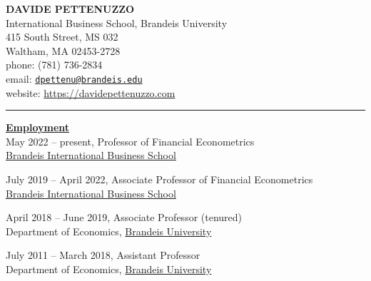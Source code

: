 \documentclass[12pt]{article}
\begin{document}
\begin{center}
\textbf{DAVIDE PETTENUZZO} \\
International Business School, Brandeis University \\
415 South Street, MS 032\\
Waltham, MA 02453-2728 \\
phone: (781) 736-2834 \\
email: \href{mailto:dpettenu@brandeis.edu}{\nolinkurl{dpettenu@brandeis.edu}} \\
website: \url{https://davidepettenuzzo.com} \\
\end{center}
\hrule 

\bigskip

\vspace{0.15in}

\underline{\textbf{Employment}}\\

May 2022 -- present, Professor  of Financial Econometrics\\
\hspace*{10mm} \underline{Brandeis International Business School}

July 2019 -- April 2022, Associate Professor  of Financial Econometrics\\
\hspace*{10mm} \underline{Brandeis International Business School}

April 2018 -- June 2019, Associate Professor (tenured) \\
\hspace*{10mm} Department of Economics, \underline{Brandeis University}

July 2011 -- March 2018, Assistant Professor \\
\hspace*{10mm} Department of Economics, \underline{Brandeis University}
 
\end{document}
